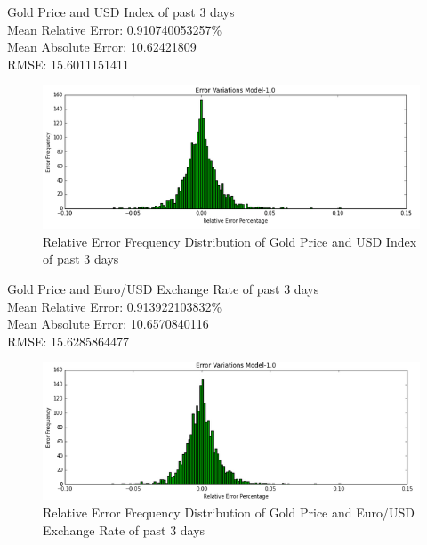 \documentclass[runningheads]{llncs}
\begin{document}
\noindent Gold Price and USD Index of past 3 days \\
Mean Relative Error: 0.910740053257\% \\
Mean Absolute Error:  10.62421809 \\
RMSE: 15.6011151411 \\
\begin{figure}
\centering
\includegraphics[width=\textwidth]{GoldUSD_Daily.png}
\caption{Relative Error Frequency Distribution of Gold Price and USD Index of past 3 days}
\label{fig:GoldUSD_Daily.png}
\end{figure}

\noindent Gold Price and Euro/USD Exchange Rate of past 3 days \\
Mean Relative Error: 0.913922103832\% \\
Mean Absolute Error:  10.6570840116 \\
RMSE: 15.6285864477 \\
\begin{figure}
\centering
\includegraphics[width=\textwidth]{GoldEuro_Daily.png}
\caption{Relative Error Frequency Distribution of Gold Price and Euro/USD Exchange Rate of past 3 days}
\label{fig:GoldEuro_Daily.png}
\end{figure}
\end{document}
